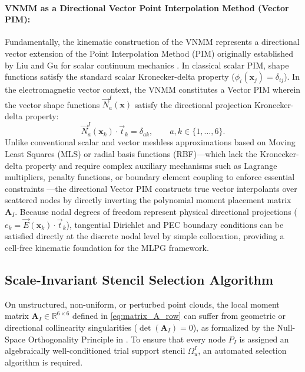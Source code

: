 \documentclass[VANCOUVER,Times1COL]{WileyNJD-v5}
\begin{document}
\paragraph{VNMM as a Directional Vector Point Interpolation Method (Vector PIM):}
Fundamentally, the kinematic construction of the VNMM represents a directional vector extension of the Point Interpolation Method (PIM) originally established by Liu and Gu for scalar continuum mechanics \cite{liu2001point, liu2005introduction}. In classical scalar PIM, shape functions satisfy the standard scalar Kronecker-delta property ($\phi_i(\mathbf{x}_j) = \delta_{ij}$). In the electromagnetic vector context, the VNMM constitutes a Vector PIM wherein the vector shape functions $\vec{N}_a^I(\mathbf{x})$ satisfy the directional projection Kronecker-delta property:
\begin{equation}
    \vec{N}_a^I(\mathbf{x}_k) \cdot \vec{t}_k = \delta_{ak}, \qquad a, k \in \{1, \dots, 6\}.
    \label{eq:vector_pim_kronecker}
\end{equation}
Unlike conventional scalar and vector meshless approximations based on Moving Least Squares (MLS) or radial basis functions (RBF)---which lack the Kronecker-delta property and require complex auxiliary mechanisms such as Lagrange multipliers, penalty functions, or boundary element coupling to enforce essential constraints \cite{atluri2002meshless}---the directional Vector PIM constructs true vector interpolants over scattered nodes by directly inverting the polynomial moment placement matrix $\mathbf{A}_I$. Because nodal degrees of freedom represent physical directional projections ($e_k = \vec{E}(\mathbf{x}_k) \cdot \vec{t}_k$), tangential Dirichlet and PEC boundary conditions can be satisfied directly at the discrete nodal level by simple collocation, providing a cell-free kinematic foundation for the MLPG framework.

\subsection{Scale-Invariant Stencil Selection Algorithm}
\label{subsec:stencil_selection}

On unstructured, non-uniform, or perturbed point clouds, the local moment matrix $\mathbf{A}_I \in \mathbb{R}^{6 \times 6}$ defined in \eqref{eq:matrix_A_row} can suffer from geometric or directional collinearity singularities ($\det(\mathbf{A}_I) = 0$), as formalized by the Null-Space Orthogonality Principle in \cite{stable_vnmm2d_2026}. To ensure that every node $P_I$ is assigned an algebraically well-conditioned trial support stencil $\Omega_u^I$, an automated selection algorithm is required.
\end{document}
